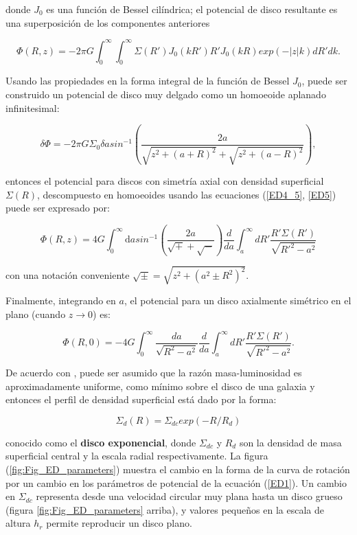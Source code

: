 donde $J_0$ es una función de Bessel cilíndrica; el potencial de disco resultante es una superposición de los componentes anteriores

$$ \Phi (R,z) = -2\pi G \int_0^{\infty} \int_0^{\infty} \Sigma(R') J_0(kR') R' J_0 (kR) exp(-|z|k) dR' dk. $$

Usando las propiedades en la forma integral de la función de Bessel $J_0$, puede ser construido un potencial de disco muy delgado como un homoeoide aplanado infinitesimal:

$$\delta\Phi= -2{\pi}G\Sigma_0\delta a{sin^{-1}} \left (\frac{2a}{\sqrt{z^2+(a+R)^2}+{\sqrt{z^2+(a-R)^2}}} \right ), $$

entonces el potencial para discos con simetría axial con densidad superficial $\Sigma(R)$, descompuesto en homoeoides usando las ecuaciones (\ref{ED4_5}, \ref{ED5}) puede ser expresado por:

$$ \Phi(R,z) = 4G \int_0^{\infty} \textrm{d}a sin^{-1} \left ( \frac{2a}{\sqrt{+}+\sqrt{-}} \right ) \frac{d}{da} \int_a^{\infty} dR' \frac{R'\Sigma (R')}{\sqrt{R'^2 - a^2}}$$

con una notación conveniente $\sqrt{\pm} = \sqrt{z^2+(a^2\pm R^2)^2}.$

Finalmente, integrando en $a$, el potencial para un disco axialmente simétrico en el plano (cuando $z \rightarrow 0$) es:

\begin{equation}
\label{ED2}
\Phi(R,0) = -4G \int_0^{\infty} \frac{da}{\sqrt{R^2-a^2}} \frac{d}{da} \int_a^{\infty} dR' \frac{R'\Sigma (R')}{\sqrt{R'^2 - a^2}}.
\end{equation}

De acuerdo con \cite{Freeman}, puede ser asumido que la razón masa-luminosidad es aproximadamente uniforme, como mínimo sobre el disco de una galaxia y entonces el perfil de densidad superficial está dado por la forma:

\begin{equation}
\label{ED1}
\Sigma_d (R) = \Sigma_{dc} exp(-R/R_d)
\end{equation}

conocido como el \textbf{disco exponencial}, donde $\Sigma_{dc}$ y $R_d$ son la densidad de masa superficial central y la escala radial respectivamente. La figura (\ref{fig:Fig_ED_parameters}) muestra el cambio en la forma de la curva de rotación por un cambio en los parámetros de potencial de la ecuación (\ref{ED1}). Un cambio en $\Sigma_{dc}$  representa desde una velocidad circular muy plana hasta un disco grueso (figura \ref{fig:Fig_ED_parameters} arriba), y valores pequeños en la escala de altura $h_r$ permite reproducir un disco plano.\\

